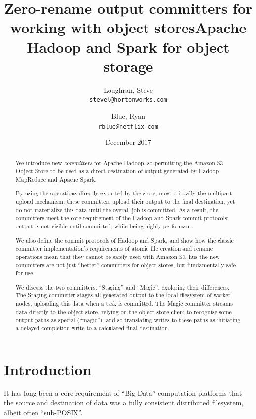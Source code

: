 \documentclass[9pt,technote]{IEEEtran}
\title{Zero-rename output committers for working with object storesApache Hadoop and Spark for object storage}
\author{
  Loughran, Steve\\
  \texttt{stevel@hortonworks.com}
\and
  Blue, Ryan\\
  \texttt{rblue@netflix.com}

}
\date{December 2017}
\begin{document}




\maketitle


\begin{abstract}

We introduce new \emph{committers} for Apache Hadoop, so permitting
the Amazon S3 Object Store to be used as a direct destination of output generated
by Hadoop MapReduce and Apache Spark.

By using the operations directly exported by
the store, most critically the multipart upload mechanism, these committers upload
their output to the final destination, yet do not materialize this data until the
overall job is committed.
As a result, the committers meet the core requirement of the Hadoop and Spark commit
protocols: output is not visible until committed, while being highly-performant.

We also define the commit protocols of Hadoop and Spark, and show how the classic committer
implementation's requirements of atomic file creation and rename operations mean that they
cannot be safely used with Amazon S3.
hus the new committers are not just ``better'' committers for object stores,
but fundamentally safe for use.

We discuss the two committers, ``Staging'' and ``Magic'', exploring their differences.
The Staging committer stages all generated output to the local filesystem of
worker nodes, uploading this data when a task is committed.
The Magic committer streams data directly to the object store, relying on the
object store client to recognise some output paths as special (``magic''), and
so translating writes to these paths as initiating a delayed-completion write to a calculated final destination.

\end{abstract}


\section{Introduction}
\label{sec:introduction}

It has long been a core requirement of ``Big Data'' computation platforms that
the source and destination of data was a fully consistent distributed filesystem,
albeit often ``sub-POSIX''.
\end{document}
